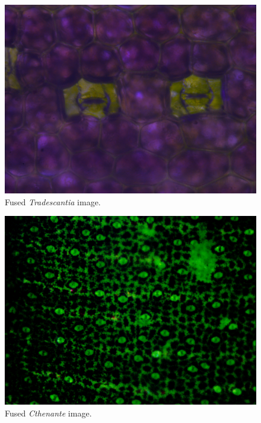 \begin{figure}[H]
    \centering
    \caption{Fused \textit{Tradescantia} image.}
    \label{fig:fused_tradescantia}
    \includegraphics[scale=0.3]{images/fused_tradescantia.png}
    \centering
    \fautor
\end{figure}

\begin{figure}[H]
  \centering
  \caption{Fused \textit{Cthenante} image.}
  \label{fig:fused_cthenante}
  \includegraphics[scale=0.3]{images/fused_cthenante.png}
  \centering
  \fautor
\end{figure}

